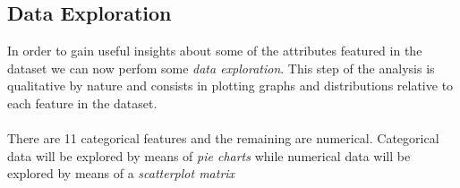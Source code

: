 \subsection{Data Exploration}
In order to gain useful insights about some of the attributes featured in the dataset we can now perfom some \textit{data exploration}. This step of the analysis is qualitative by nature and consists in plotting graphs and distributions relative to each feature in the dataset.\\
\\
 There are 11 categorical features and the remaining are numerical. Categorical data will be explored by means of \textit{pie charts} while numerical data will be explored by means of a \textit{scatterplot matrix}

\begin{figure}[H]
    \centering
    \qquad
    \qquad

\end{figure}
